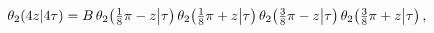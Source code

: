 \[\mathop{\theta_{2}\/}\nolimits\!\left(4z\middle|4\tau\right)=B\mathop{\theta_{%
2}\/}\nolimits\!\left(\tfrac{1}{8}\pi-z\middle|\tau\right)\mathop{\theta_{2}\/%
}\nolimits\!\left(\tfrac{1}{8}\pi+z\middle|\tau\right)\*\mathop{\theta_{2}\/}%
\nolimits\!\left(\tfrac{3}{8}\pi-z\middle|\tau\right)\mathop{\theta_{2}\/}%
\nolimits\!\left(\tfrac{3}{8}\pi+z\middle|\tau\right),\]